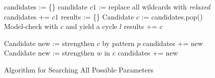 \begin{figure}[!htbp]
\begin{algorithmic}[1]
\State candidates := \{\}
\State candidate $c1$ := replace all wildcards with \textit{relaxed}
\State candidates += $c1$
\State results := \{\}
\State Candidate $c$ := candidates.pop()
\State Model-check with $c$ and yield a cycle $l$
\State results += $c$
\Else
\State {}
\EndIf
\EndWhile
\State {}
\EndFunction

\State Candidate new := strengthen $c$ by pattern $p$
\State candidates += new 
\Else
{}
\State Candidate new := strengthen $w$ in $c$
\State candidates += new
\EndIf
\EndFor
\EndIf
\EndProcedure

\end{algorithmic}
\caption{\label{fig:algorithm}Algorithm for Searching All Possible Parameters}
\end{figure}

